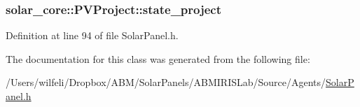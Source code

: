 \subsubsection[{state\+\_\+project}]{ solar\+\_\+core\+::\+P\+V\+Project\+::state\+\_\+project}\label{classsolar__core_1_1_p_v_project_ab25a22c1202f2314a55dc9a759922183}


Definition at line 94 of file Solar\+Panel.\+h.



The documentation for this class was generated from the following file\+:\begin{DoxyCompactItemize}
\item 
/\+Users/wilfeli/\+Dropbox/\+A\+B\+M/\+Solar\+Panels/\+A\+B\+M\+I\+R\+I\+S\+Lab/\+Source/\+Agents/\hyperlink{_solar_panel_8h}{Solar\+Panel.\+h}\end{DoxyCompactItemize}
